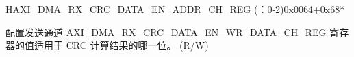 \begin{register}{H}{AXI\_DMA\_RX\_CRC\_DATA\_EN\_ADDR\_CH\_REG (：0-2)}{0x0064+0x68*}\label{regdesc:AXIDMARXCRCDATAENADDRCHNREG}
%
\regnewline%
\begin{regdesc}\begin{reglist}
\label{fielddesc:AXIDMARXCRCDATAENADDRCHN}\item [AXI\_DMA\_RX\_CRC\_DATA\_EN\_ADDR\_CH\regindex{n}] 配置发送通道  AXI\_DMA\_RX\_CRC\_DATA\_EN\_WR\_DATA\_CH\_REG 寄存器的值适用于 CRC 计算结果的哪一位。 (R/W)
\end{reglist}\end{regdesc}
\end{register}


